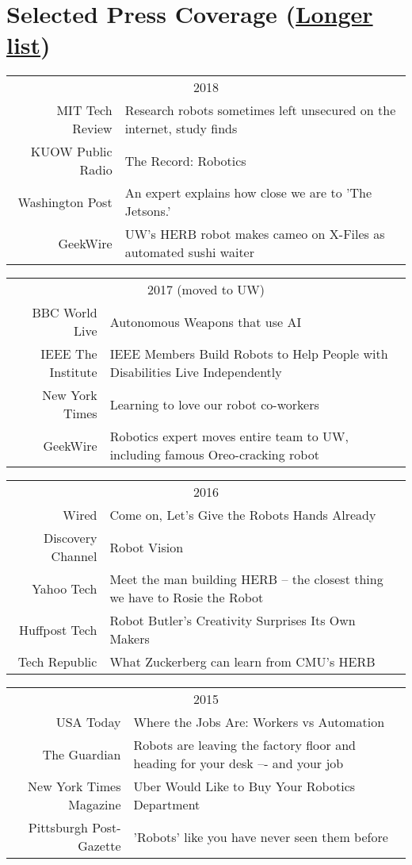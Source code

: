 
\section{Selected Press Coverage (\href{https://personalrobotics.cs.washington.edu/press/}{Longer list})}
\begin{tabularx}{\linewidth}{rX}
\multicolumn{2}{c}{2018}\\ 
MIT Tech Review & Research robots sometimes left unsecured on the internet, study finds\\
KUOW Public Radio & The Record: Robotics\\
Washington Post & An expert explains how close we are to 'The Jetsons.'\\
GeekWire & UW’s HERB robot makes cameo on X-Files as automated sushi waiter\\
\end{tabularx}
\begin{tabularx}{\linewidth}{rX}
\multicolumn{2}{c}{2017 (moved to UW)}\\ 
BBC World Live & Autonomous Weapons that use AI\\
IEEE The Institute &  IEEE Members Build Robots to Help People with Disabilities Live Independently\\
New York Times & Learning to love our robot co-workers\\
GeekWire & Robotics expert moves entire team to UW, including famous Oreo-cracking robot\\
\end{tabularx}
\begin{tabularx}{\linewidth}{rX}
\multicolumn{2}{c}{2016}\\ 
Wired &  Come on, Let’s Give the Robots Hands Already\\
Discovery Channel &    Robot Vision\\
Yahoo Tech & Meet the man building HERB -- the closest thing we have to Rosie the Robot\\
Huffpost Tech &  Robot Butler's Creativity Surprises Its Own Makers\\
Tech Republic &  What Zuckerberg can learn from CMU's HERB\\
\end{tabularx}
\begin{tabularx}{\linewidth}{rX}
\multicolumn{2}{c}{2015}\\ 
USA Today &  Where the Jobs Are: Workers vs Automation\\
The Guardian  & Robots are leaving the factory floor and heading for your desk –- and your job\\
New York Times Magazine & Uber Would Like to Buy Your Robotics Department\\
Pittsburgh Post-Gazette & 'Robots' like you have never seen them before\\
\end{tabularx}
